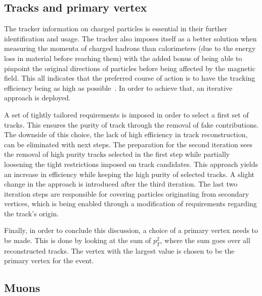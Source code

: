 \subsection{Tracks and primary vertex}
\label{sec:tracking}
\hspace{10pt} The tracker information on charged particles is essential in their further identification and usage. The tracker also imposes itself as a better solution when measuring the momenta of charged hadrons than calorimeters (due to the energy loss in material before reaching them) with the added bonus of being able to pinpoint the original directions of particles before being affected by the magnetic field. This all indicates that the preferred course of action is to have the tracking efficiency being as high as possible~\cite{PF:track}. In order to achieve that, an iterative approach is deployed.

\hspace{10pt} A set of tightly tailored requirements is imposed in order to select a first set of tracks. This ensures the purity of track through the removal of fake contributions. The downside of this choice, the lack of high efficiency in track reconstruction, can be eliminated with next steps. The preparation for the second iteration sees the removal of high purity tracks selected in the first step while partially loosening the tight restrictions imposed on track candidates. This approach yields an increase in efficiency while keeping the high purity of selected tracks. A slight change in the approach is introduced after the third iteration. The last two iteration steps are responsible for covering particles originating from secondary vertices, which is being enabled through a modification of requirements regarding the track's origin.

\hspace{10pt} Finally, in order to conclude this discussion, a choice of a primary vertex needs to be made. This is done by looking at the sum of $p_T^2$, where the sum goes over all reconstructed tracks. The vertex with the largest value is chosen to be the primary vertex for the event.

\subsection{Muons}
\label{subsec:muons}

